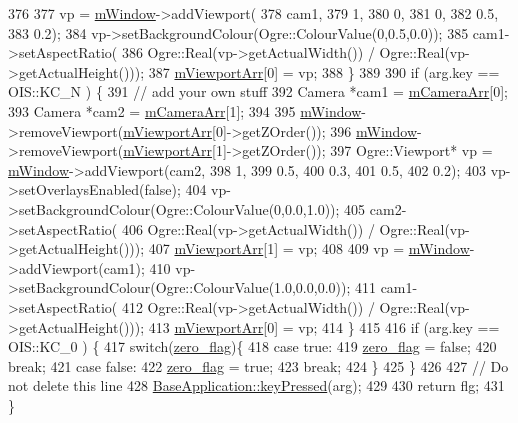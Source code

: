 \begin{DoxyCode}
376 
377     vp = \hyperlink{class_base_application_ac5d8e9c81e036897bc82f81eff8c570f}{mWindow}->addViewport(
378         cam1,
379         1,
380         0,
381         0,
382         0.5,
383         0.2);
384     vp->setBackgroundColour(Ogre::ColourValue(0,0.5,0.0));
385     cam1->setAspectRatio(
386         Ogre::Real(vp->getActualWidth()) / Ogre::Real(vp->getActualHeight()));
387         \hyperlink{class_basic_tutorial__00_a6676a92b50e9b43634d4c66488537b73}{mViewportArr}[0] = vp;          
388     \}
389 
390     \textcolor{keywordflow}{if} (arg.key == OIS::KC\_N ) \{
391         \textcolor{comment}{// add your own stuff}
392        Camera *cam1 = \hyperlink{class_basic_tutorial__00_af8d457d912286a98c0975c52d4faf910}{mCameraArr}[0];
393        Camera *cam2 = \hyperlink{class_basic_tutorial__00_af8d457d912286a98c0975c52d4faf910}{mCameraArr}[1];
394 
395        \hyperlink{class_base_application_ac5d8e9c81e036897bc82f81eff8c570f}{mWindow}->removeViewport(\hyperlink{class_basic_tutorial__00_a6676a92b50e9b43634d4c66488537b73}{mViewportArr}[0]->getZOrder());
396        \hyperlink{class_base_application_ac5d8e9c81e036897bc82f81eff8c570f}{mWindow}->removeViewport(\hyperlink{class_basic_tutorial__00_a6676a92b50e9b43634d4c66488537b73}{mViewportArr}[1]->getZOrder());
397     Ogre::Viewport* vp = \hyperlink{class_base_application_ac5d8e9c81e036897bc82f81eff8c570f}{mWindow}->addViewport(cam2,
398         1,
399         0.5,
400         0.3,
401         0.5,
402         0.2);
403     vp->setOverlaysEnabled(\textcolor{keyword}{false});
404     vp->setBackgroundColour(Ogre::ColourValue(0,0.0,1.0));
405     cam2->setAspectRatio(
406         Ogre::Real(vp->getActualWidth()) / Ogre::Real(vp->getActualHeight()));
407     \hyperlink{class_basic_tutorial__00_a6676a92b50e9b43634d4c66488537b73}{mViewportArr}[1] = vp;    
408 
409     vp = \hyperlink{class_base_application_ac5d8e9c81e036897bc82f81eff8c570f}{mWindow}->addViewport(cam1);
410     vp->setBackgroundColour(Ogre::ColourValue(1.0,0.0,0.0));
411     cam1->setAspectRatio(
412         Ogre::Real(vp->getActualWidth()) / Ogre::Real(vp->getActualHeight()));
413     \hyperlink{class_basic_tutorial__00_a6676a92b50e9b43634d4c66488537b73}{mViewportArr}[0] = vp;     
414     \}
415 
416     \textcolor{keywordflow}{if} (arg.key == OIS::KC\_0 ) \{
417         \textcolor{keywordflow}{switch}(\hyperlink{_tutorial_application_8cpp_a99a5608017531b46cd3234d001ec1dcb}{zero\_flag})\{
418             \textcolor{keywordflow}{case} \textcolor{keyword}{true}:
419                 \hyperlink{_tutorial_application_8cpp_a99a5608017531b46cd3234d001ec1dcb}{zero\_flag} = \textcolor{keyword}{false};
420                 \textcolor{keywordflow}{break};
421             \textcolor{keywordflow}{case} \textcolor{keyword}{false}:
422                 \hyperlink{_tutorial_application_8cpp_a99a5608017531b46cd3234d001ec1dcb}{zero\_flag} = \textcolor{keyword}{true};
423                 \textcolor{keywordflow}{break};
424         \}
425     \}
426 
427     \textcolor{comment}{// Do not delete this line}
428     \hyperlink{class_base_application_acfa977f04e435f18018ece805c1277ec}{BaseApplication::keyPressed}(arg);
429 
430     \textcolor{keywordflow}{return} flg;
431 \}
\end{DoxyCode}

